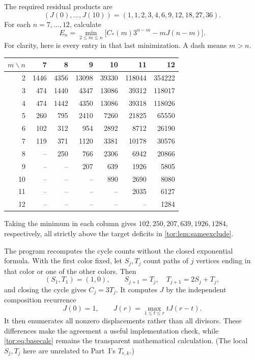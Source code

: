 \documentclass[11pt,a4paper]{article}
\numberwithin{equation}{section}
\theoremstyle{definition}
\theoremstyle{remark}
\begin{document}
The required residual products are
\[
 (J(0),\ldots,J(10))=(1,1,2,3,4,6,9,12,18,27,36).
\]
For each $n=7,\ldots,12$, calculate
\begin{equation}\label{tor:eq:basecalc}
 E_n=\min_{2\le m\le n}\bigl[C_*(m)3^{n-m}-mJ(n-m)\bigr].
\end{equation}
For clarity, here is every entry in that last minimization. A dash means
$m>n$.
\begin{center}
\small
\begin{tabular}{@{}rrrrrrr@{}}
\toprule
$m\backslash n$ & 7 & 8 & 9 & 10 & 11 & 12\\
\midrule
2 & 1446 & 4356 & 13098 & 39330 & 118044 & 354222\\
3 & 474 & 1440 & 4347 & 13086 & 39312 & 118017\\
4 & 474 & 1442 & 4350 & 13086 & 39318 & 118026\\
5 & 260 & 795 & 2410 & 7260 & 21825 & 65550\\
6 & 102 & 312 & 954 & 2892 & 8712 & 26190\\
7 & 119 & 371 & 1120 & 3381 & 10178 & 30576\\
8 & -- & 250 & 766 & 2306 & 6942 & 20866\\
9 & -- & -- & 207 & 639 & 1926 & 5805\\
10 & -- & -- & -- & 890 & 2690 & 8080\\
11 & -- & -- & -- & -- & 2035 & 6127\\
12 & -- & -- & -- & -- & -- & 1284\\
\bottomrule
\end{tabular}
\end{center}
Taking the minimum in each column gives $102,250,207,639,1926,1284$,
respectively, all strictly above the target deficits in
\cref{tor:lem:sameexclude}.

The program  recomputes the
cycle counts without the closed exponential formula. With the first color
fixed, let $S_j,T_j$ count paths of $j$ vertices ending in that color or one
of the other colors. Then
\[
 (S_1,T_1)=(1,0),\qquad
 S_{j+1}=T_j,\quad T_{j+1}=2S_j+T_j,
\]
and closing the cycle gives $C_j=3T_j$. It computes $J$ by the independent
composition recurrence
\[
 J(0)=1,\qquad J(r)=\max_{1\le t\le r}tJ(r-t).
\]
It then enumerates all nonzero displacements rather than all divisors. These
differences make the agreement a useful implementation check, while
\eqref{tor:eq:basecalc} remains the transparent mathematical calculation.
(The local $S_j,T_j$ here are unrelated to Part~I's $T_{r,k}$.)
\end{document}
